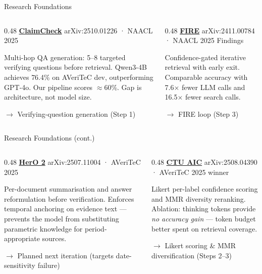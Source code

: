 \documentclass[11pt, aspectratio=169]{beamer}
\newcommand{\src}[1]{{\small\textcolor{slate}{#1}}}
\begin{document}
\begin{frame}{Research Foundations}
  \begin{columns}[T]
    \begin{column}{0.48\textwidth}
      \href{https://arxiv.org/abs/2510.01226}{\textbf{ClaimCheck}}
      \src{arXiv:2510.01226 · NAACL 2025}

      \bigskip
      Multi-hop QA generation: 5--8 targeted verifying questions before retrieval.
      Qwen3-4B achieves \alert{76.4\%} on AVeriTeC dev, outperforming GPT-4o.
      Our pipeline scores $\approx$60\%. Gap is architecture, not model size.

      \bigskip
      \src{$\to$ Verifying-question generation (Step 1)}
    \end{column}
    \begin{column}{0.48\textwidth}
      \href{https://arxiv.org/abs/2411.00784}{\textbf{FIRE}}
      \src{arXiv:2411.00784 · NAACL 2025 Findings}

      \bigskip
      Confidence-gated iterative retrieval with early exit.
      Comparable accuracy with \alert{7.6$\times$ fewer LLM calls}
      and 16.5$\times$ fewer search calls.

      \bigskip
      \src{$\to$ FIRE loop (Step 3)}
    \end{column}
  \end{columns}
\end{frame}

\begin{frame}{Research Foundations (cont.)}
  \begin{columns}[T]
    \begin{column}{0.48\textwidth}
      \href{https://arxiv.org/abs/2507.11004}{\textbf{HerO 2}}
      \src{arXiv:2507.11004 · AVeriTeC 2025}

      \bigskip
      Per-document summarisation and answer reformulation before verification.
      Enforces temporal anchoring on evidence text — prevents the model
      from substituting parametric knowledge for period-appropriate sources.

      \bigskip
      \src{$\to$ Planned next iteration (targets date-sensitivity failure)}
    \end{column}
    \begin{column}{0.48\textwidth}
      \href{https://arxiv.org/abs/2508.04390}{\textbf{CTU AIC}}
      \src{arXiv:2508.04390 · AVeriTeC 2025 winner}

      \bigskip
      Likert per-label confidence scoring and MMR diversity reranking.
      Ablation: thinking tokens provide \emph{no accuracy gain} — token
      budget better spent on retrieval coverage.

      \bigskip
      \src{$\to$ Likert scoring \& MMR diversification (Steps 2--3)}
    \end{column}
  \end{columns}
\end{frame}
\end{document}

